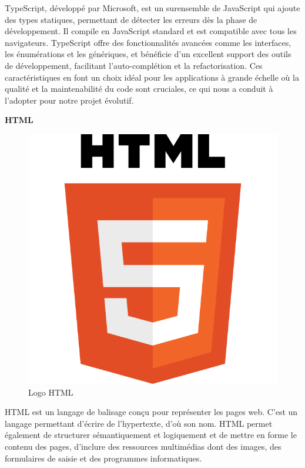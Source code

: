 TypeScript, développé par Microsoft, est un surensemble de 
JavaScript qui ajoute des types statiques, permettant de
détecter les erreurs dès la phase de développement. Il compile 
en JavaScript standard et est compatible avec tous les 
navigateurs. TypeScript offre des fonctionnalités avancées 
comme les interfaces, les énumérations et les génériques, 
et bénéficie d'un excellent support des outils de développement, 
facilitant l'auto-complétion et la refactorisation\cite{TypeScript}. 
Ces caractéristiques en 
font un choix idéal pour les applications à grande échelle 
où la qualité et la maintenabilité du code sont cruciales, 
ce qui nous a conduit à l'adopter pour notre projet évolutif.
\newline

\large
\textbf{HTML}
\begin{figure}[htbp]
   \centering
   \includegraphics[scale=0.15]{Images/html.png} 
   \caption{Logo HTML}
   \label{fig:html}
\end{figure}

HTML est un langage de balisage conçu pour représenter les pages
 web. C’est un langage permettant d’écrire de l’hypertexte, 
 d’où son nom. HTML permet également de structurer sémantiquement 
 et logiquement et de mettre en forme le contenu des pages, 
 d’inclure des ressources multimédias dont des images, des 
 formulaires de saisie et des programmes informatiques\cite{HTML}.
\newline


